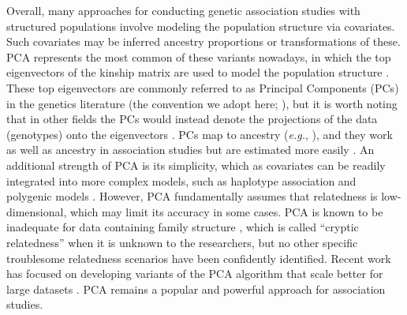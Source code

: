 \documentclass[11pt]{article}
\begin{document}
Overall, many approaches for conducting genetic association studies with structured populations involve modeling the population structure via covariates.
Such covariates may be inferred ancestry proportions \citep{pritchard_association_2000} or transformations of these.
PCA represents the most common of these variants nowadays, in which the top eigenvectors of the kinship matrix are used to model the population structure \citep{zhang_semiparametric_2003, price_principal_2006, bouaziz_accounting_2011}.
These top eigenvectors are commonly referred to as Principal Components (PCs) in the genetics literature (the convention we adopt here; \cite{patterson_population_2006}), but it is worth noting that in other fields the PCs would instead denote the projections of the data (genotypes) onto the eigenvectors \citep{jolliffe_principal_2002}.
PCs map to ancestry (\textit{e.g.}, \cite{alexander_fast_2009, zhou_strong_2016}), and they work as well as ancestry in association studies but are estimated more easily \citep{patterson_population_2006, zhao_arabidopsis_2007, alexander_fast_2009, bouaziz_accounting_2011}.
An additional strength of PCA is its simplicity, which as covariates can be readily integrated into more complex models, such as haplotype association \citep{xu_detecting_2014} and polygenic models \citep{qian_fast_2020}.
However, PCA fundamentally assumes that relatedness is low-dimensional, which may limit its accuracy in some cases.
PCA is known to be inadequate for data containing family structure \citep{patterson_population_2006, thornton_roadtrips:_2010, price_new_2010}, which is called ``cryptic relatedness'' when it is unknown to the researchers, but no other specific troublesome relatedness scenarios have been confidently identified.
Recent work has focused on developing variants of the PCA algorithm that scale better for large datasets \citep{lee_sparse_2012, abraham_fast_2014, galinsky_fast_2016, abraham_flashpca2:_2017, agrawal_scalable_2020}.
PCA remains a popular and powerful approach for association studies. %
\end{document}
